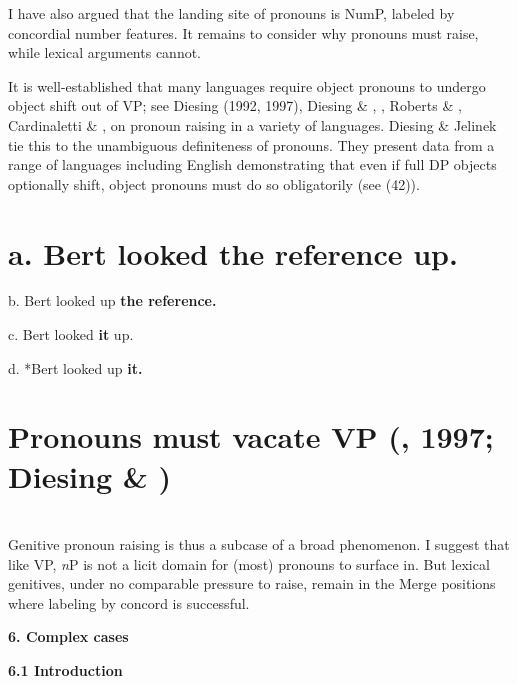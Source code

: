 \documentclass[output=paper
,modfonts
,nonflat]{langsci/langscibook}
\begin{document}
I have also argued that the landing site of pronouns is NumP, labeled by concordial number features. It remains to consider why pronouns must raise, while lexical arguments cannot. 

It is well-established that many languages require object pronouns to undergo object shift out of VP; see Diesing (1992, 1997), Diesing \& \citet{Jelinek1995}, \citealt{Diesing1997}, Roberts \& \citet{Shlonsky1996}, Cardinaletti \& \citet{Starke1999}, \citet{Holmberg1999} on pronoun raising in a variety of languages.  Diesing \& Jelinek tie this to the unambiguous definiteness of pronouns. They present data from a range of languages including English demonstrating that even if full DP objects optionally shift, object pronouns must do so obligatorily (see (42)). 

\section{  a.  Bert looked \textbf{the reference} up.}
\label{bkm:Ref515543371}\begin{styleexample}
b.   Bert looked up \textbf{the reference.}
\end{styleexample}

\begin{styleexample}
c.   Bert looked \textbf{it} up.
\end{styleexample}

\begin{styleexample}
d.  *Bert looked up \textbf{it.}
\end{styleexample}

\section{Pronouns must vacate VP (\citealt{Diesing1992}, 1997; Diesing \& \citealt{Jelinek1995})}
\section{} 

Genitive pronoun raising is thus a subcase of a broad phenomenon. I suggest that like VP, \textit{n}P is not a licit domain for (most) pronouns to surface in. But lexical genitives, under no comparable pressure to raise, remain in the Merge positions where labeling by concord is successful. 

\textbf{6.  Complex cases}

\textbf{6.1  Introduction}
\end{document}
